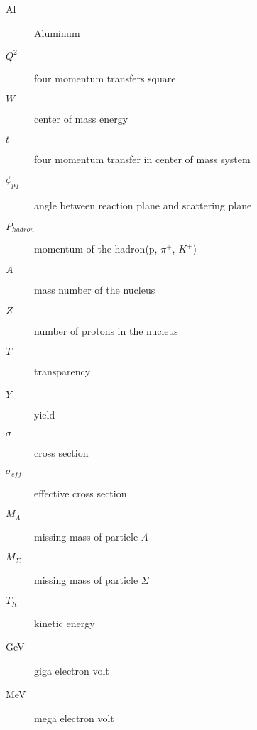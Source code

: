 \begin{description}
   \item[Al] Aluminum
   \item[$Q^2$] four momentum transfers square
   \item[$W$] center of mass energy
   \item[$t$] four momentum transfer in center of mass system
   \item[$\phi_{pq}$] angle between reaction plane and scattering plane         
   \item[$P_{hadron}$] momentum of the hadron(p, $\pi^+$, $K^+$)
	 \item[$A$] mass number of the nucleus
	 \item[$Z$] number of protons in the nucleus
	 \item[$T$] transparency
	 \item[$\bar{Y}$] yield
	 \item[$\sigma$] cross section
	 \item[$\sigma_{eff}$] effective cross section
	 \item[$M_\Lambda$] missing mass of particle $\Lambda$
	 \item[$M_\Sigma$] missing mass of particle $\Sigma$
	 \item[$T_K$] kinetic energy
	 \item[GeV] giga electron volt
	 \item[MeV] mega electron volt
\end{description}
